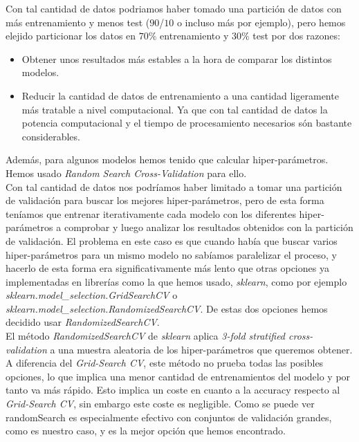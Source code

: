 \documentclass[a4paper]{article}
\begin{document}
Con tal cantidad de datos podriamos haber tomado una partición de datos con más entrenamiento y menos test ($90$/$10$ o incluso más por ejemplo), pero hemos elejido particionar los datos en $70\%$ entrenamiento y $30\%$ test por dos razones:
\begin{itemize}
\item Obtener unos resultados más estables a la hora de comparar los distintos modelos.
\item Reducir la cantidad de datos de entrenamiento a una cantidad ligeramente más tratable a nivel computacional. Ya que con tal cantidad de datos la potencia computacional y el tiempo de procesamiento necesarios són bastante considerables. 
\end{itemize}

Además, para algunos modelos hemos tenido que calcular hiper-parámetros. Hemos usado \textit{Random Search Cross-Validation} para ello.\\

Con tal cantidad de datos nos podríamos haber limitado a tomar una partición de validación para buscar los mejores hiper-parámetros, pero de esta forma teníamos que entrenar iterativamente cada modelo con los diferentes hiper-parámetros a comprobar y luego analizar los resultados obtenidos con la partición de validación. El problema en este caso es que cuando había que buscar varios hiper-parámetros para un mismo modelo no sabíamos paralelizar el proceso, y hacerlo de esta forma era significativamente más lento que otras opciones ya implementadas en librerías como la que hemos usado, \textit{sklearn}, como por ejemplo  \textit{sklearn.model\_selection.GridSearchCV} o \textit{sklearn.model\_selection.RandomizedSearchCV}. De estas dos opciones hemos decidido usar \textit{RandomizedSearchCV}.\\

El método \textit{RandomizedSearchCV} de \textit{sklearn} aplica \textit{3-fold stratified cross-validation} a una muestra aleatoria de los hiper-parámetros que queremos obtener. A diferencia del \textit{Grid-Search CV}, este método no prueba todas las posibles opciones, lo que implica una menor cantidad de entrenamientos del modelo y por tanto va más rápido. Esto implica un coste en cuanto a la accuracy respecto al \textit{Grid-Search CV}, sin embargo este coste es negligible. Como se puede ver randomSearch\cite{randomSearch} es especialmente efectivo con conjuntos de validación grandes, como es nuestro caso, y es la mejor opción que hemos encontrado.\\
\end{document}
